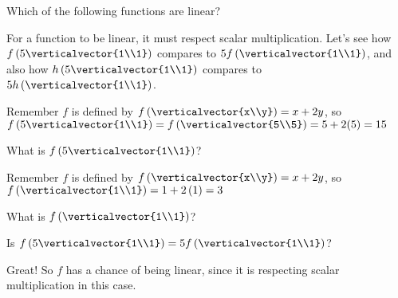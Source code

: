 \documentclass{ximera}
\begin{document}
\begin{question}
  Which of the following functions are linear?
  \begin{solution}
    \begin{hint}
    	For a function to be linear, it must respect scalar multiplication.  Let's see how $f\left(5 \verticalvector{1\\1}\right)$ compares to $5 f\left(\verticalvector{1\\1}\right)$, and also how
        $h\left(5 \verticalvector{1\\1}\right)$ compares to $5 h\left(\verticalvector{1\\1}\right)$.  
	
        \begin{question}
        	\begin{solution}
		\begin{hint}
			Remember $f$ is defined by $f\left( \verticalvector{x\\y}\right) =x+2y$, so
			$f\left(5 \verticalvector{1\\1}\right) = f\left(\verticalvector{5\\5}\right) = 5+2(5) = 15$
		\end{hint}
        	 What is $f\left(5 \verticalvector{1\\1}\right)$?
        	\end{solution}
        	\begin{solution}
		\begin{hint}
			Remember $f$ is defined by $f\left( \verticalvector{x\\y}\right) =x+2y$, so
			$f\left(\verticalvector{1\\1}\right) = 1+2\left(1\right) = 3$
		\end{hint}
        	 What is $f\left(\verticalvector{1\\1}\right)$?
        	 \answer{3}
        	\end{solution}
        	\begin{solution}
        		Is $f\left(5 \verticalvector{1\\1}\right) = 5 f\left(\verticalvector{1\\1}\right)$?
        		\begin{multiple-choice}
        		\choice[correct]{Yes}
        		\choice{No}
        		\end{multiple-choice}
        	\end{solution}
        	Great!  So $f$ has a chance of being linear, since it is respecting scalar multiplication in this case.

\end{question}
\end{hint}
\end{solution}
\end{question}
\end{document}
